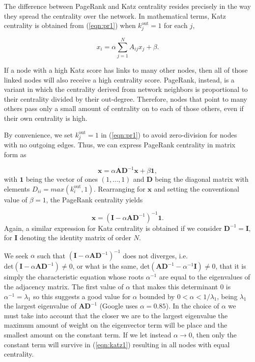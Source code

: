 The difference between PageRank and Katz centrality resides precisely in the way they spread the centrality over the network. In mathematical terms, Katz centrality is obtained from (\ref{eqn:pr1}) when $k_j^{\text{out}}=1$ for each $j$,

\begin{equation}
\label{eqn:katz1}
    x_i= \alpha\sum_{j=1}^{N}A_{ij}x_j + \beta.
\end{equation}

If a node with a high Katz score has links to many other nodes, then all of those linked nodes will also receive a high centrality score. PageRank, instead, is a variant in which the centrality derived from network neighbors is proportional to their centrality divided by their out-degree. Therefore, nodes that point to many others pass only a small amount of centrality on to each of those others, even if their own centrality is high.

By convenience, we set $k_j^{\text{out}}=1$ in (\ref{eqn:pr1}) to avoid zero-division for nodes with no outgoing edges. Thus, we can express PageRank centrality in matrix form as

\begin{equation}
\label{eqn:pr2}
    \mathbf{x} = \alpha\mathbf{AD}^{-1}\mathbf{x} + \beta \mathbf{1},
\end{equation}
with $\mathbf{1}$ being the vector of ones $(1,\dots,1)$ and $\mathbf{D}$ being the diagonal matrix with elements $D_{ii} = max(k_i^{\text{out}},1)$. Rearranging for $\mathbf{x}$ and setting the conventional value of $\beta=1$, the PageRank centrality yields

\begin{equation}
\label{eqn:pr3}
    \mathbf{x} = (\mathbf{I} - \alpha\mathbf{AD}^{-1})^{-1} \mathbf{1}.
\end{equation}
Again, a similar expression for Katz centrality is obtained if we consider $\mathbf{D}^{-1}= \mathbf{I}$, for $\mathbf{I}$ denoting the identity matrix of order $N$.

We seek $\alpha$ such that $(\mathbf{I}-\alpha\mathbf{AD}^{-1})^{-1}$ does not diverges, i.e. $\text{det}(\mathbf{I}-\alpha\mathbf{AD}^{-1})\neq 0$, or what is the same, $\text{det}(\mathbf{AD}^{-1}-\alpha^{-1}\mathbf{I})\neq 0$, that it is simply the characteristic equation whose roots $\alpha^{-1}$ are equal to the eigenvalues of the adjacency matrix. The first value of $\alpha$ that makes this determinant $0$ is $\alpha^{-1}=\lambda_1$ so this suggests a good value for $\alpha$ bounded by $0 < \alpha < 1/\lambda_1 $, being $\lambda_1$ the largest eigenvalue of $\mathbf{AD}^{-1}$ (Google uses $\alpha = 0.85$). In the choice of $\alpha$ we must take into account that the closer we are to the largest eigenvalue the maximum amount of weight on the eigenvector term will be place and the smallest amount on the constant term. If we let instead $\alpha\to 0$, then only the constant term will survive in (\ref{eqn:katz1}) resulting in all nodes with equal centrality.

